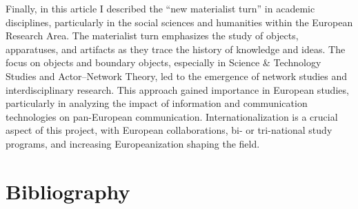 \documentclass{tufte-handout}
\begin{document}
Finally, in this article I described the ``new materialist turn'' in
academic disciplines, particularly in the social sciences and humanities
within the European Research Area. The materialist turn emphasizes the
study of objects, apparatuses, and artifacts as they trace the history
of knowledge and ideas. The focus on objects and boundary objects,
especially in Science \& Technology Studies and Actor--Network Theory,
led to the emergence of network studies and interdisciplinary research.
This approach gained importance in European studies, particularly in
analyzing the impact of information and communication technologies on
pan-European communication. Internationalization is a crucial aspect of
this project, with European collaborations, bi- or tri-national study
programs, and increasing Europeanization shaping the field.




\section{Bibliography}\label{bibliography}
\end{document}
